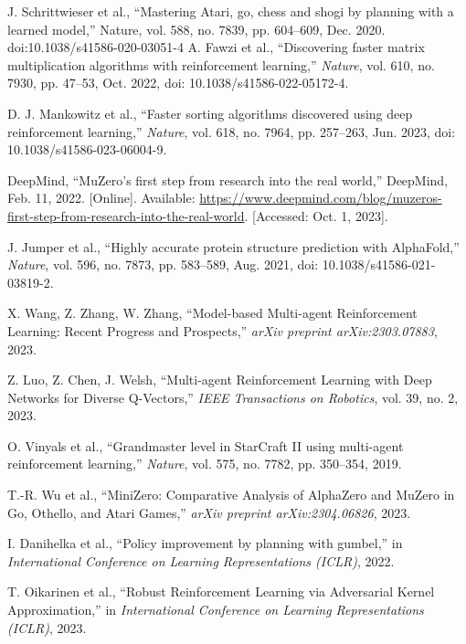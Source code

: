 \documentclass[conference]{IEEEtran}
\begin{document}
\begin{thebibliography}{00}
     J. Schrittwieser et al., “Mastering Atari, go, chess and shogi by planning with a learned model,” Nature, vol. 588, no. 7839, pp. 604–609, Dec. 2020. doi:10.1038/s41586-020-03051-4 
    A. Fawzi et al., ``Discovering faster matrix multiplication algorithms with reinforcement learning,'' \textit{Nature}, vol. 610, no. 7930, pp. 47--53, Oct. 2022, doi: 10.1038/s41586-022-05172-4.
    
    D. J. Mankowitz et al., ``Faster sorting algorithms discovered using deep reinforcement learning,'' \textit{Nature}, vol. 618, no. 7964, pp. 257–263, Jun. 2023, doi: 10.1038/s41586-023-06004-9.
    
    DeepMind, ``MuZero's first step from research into the real world,'' DeepMind, Feb. 11, 2022. [Online]. Available: \url{https://www.deepmind.com/blog/muzeros-first-step-from-research-into-the-real-world}. [Accessed: Oct. 1, 2023].
    
    J. Jumper et al., ``Highly accurate protein structure prediction with AlphaFold,'' \textit{Nature}, vol. 596, no. 7873, pp. 583–589, Aug. 2021, doi: 10.1038/s41586-021-03819-2.

    
     X. Wang, Z. Zhang, W. Zhang, ``Model-based Multi-agent Reinforcement Learning: Recent Progress and Prospects,'' \textit{arXiv preprint arXiv:2303.07883}, 2023.

     Z. Luo, Z. Chen, J. Welsh, ``Multi-agent Reinforcement Learning with Deep Networks for Diverse Q-Vectors,'' \textit{IEEE Transactions on Robotics}, vol. 39, no. 2, 2023.
    
     O. Vinyals et al., ``Grandmaster level in StarCraft II using multi-agent reinforcement learning,'' \textit{Nature}, vol. 575, no. 7782, pp. 350–354, 2019.
    
     T.-R. Wu et al., ``MiniZero: Comparative Analysis of AlphaZero and MuZero in Go, Othello, and Atari Games,'' \textit{arXiv preprint arXiv:2304.06826}, 2023.
    
     I. Danihelka et al., ``Policy improvement by planning with gumbel,'' in \textit{International Conference on Learning Representations (ICLR)}, 2022.
    
     T. Oikarinen et al., ``Robust Reinforcement Learning via Adversarial Kernel Approximation,'' in \textit{International Conference on Learning Representations (ICLR)}, 2023.



\end{thebibliography}
\vspace{12pt}
\end{document}
